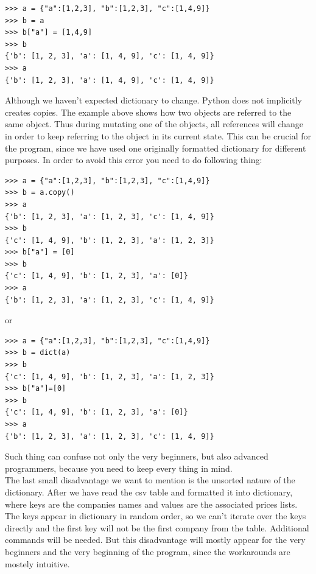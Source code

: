 \documentclass{article}
\begin{document}
\begin{verbatim}
>>> a = {"a":[1,2,3], "b":[1,2,3], "c":[1,4,9]}
>>> b = a
>>> b["a"] = [1,4,9]
>>> b
{'b': [1, 2, 3], 'a': [1, 4, 9], 'c': [1, 4, 9]}
>>> a
{'b': [1, 2, 3], 'a': [1, 4, 9], 'c': [1, 4, 9]}
\end{verbatim} 
Although we haven't expected dictionary to change. Python does not implicitly creates copies. The example above shows how two objects are referred to the same object. Thus during mutating one of the objects, all references will change in order to keep referring to the object in its current state. This can be crucial for the program, since we have used one originally formatted dictionary for different purposes. In order to avoid this error you need to do following thing:     
\begin{verbatim}
>>> a = {"a":[1,2,3], "b":[1,2,3], "c":[1,4,9]}
>>> b = a.copy()
>>> a
{'b': [1, 2, 3], 'a': [1, 2, 3], 'c': [1, 4, 9]}
>>> b
{'c': [1, 4, 9], 'b': [1, 2, 3], 'a': [1, 2, 3]}
>>> b["a"] = [0]
>>> b
{'c': [1, 4, 9], 'b': [1, 2, 3], 'a': [0]}
>>> a
{'b': [1, 2, 3], 'a': [1, 2, 3], 'c': [1, 4, 9]}
\end{verbatim}
or 
\begin{verbatim}
>>> a = {"a":[1,2,3], "b":[1,2,3], "c":[1,4,9]}
>>> b = dict(a)
>>> b
{'c': [1, 4, 9], 'b': [1, 2, 3], 'a': [1, 2, 3]}
>>> b["a"]=[0]
>>> b
{'c': [1, 4, 9], 'b': [1, 2, 3], 'a': [0]}
>>> a
{'b': [1, 2, 3], 'a': [1, 2, 3], 'c': [1, 4, 9]}
\end{verbatim}
Such thing can confuse not only the very beginners, but also advanced programmers, because you need to keep every thing in mind.\\
The last small disadvantage we want to mention is the unsorted nature of the dictionary. After we have read the csv table and formatted it into dictionary, where keys are the companies names and values are the associated prices lists. The keys appear in dictionary in random order, so we can't iterate over the keys directly and the first key will not be the first company from the table. Additional commands will be needed. But this disadvantage will mostly appear for the very beginners and the very beginning of the program, since the workarounds are mostely intuitive. 
\end{document}
